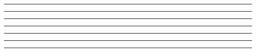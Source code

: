 \hrule height 0.05pt depth 0.05pt width 375pt
\hrule height 0.05pt depth 0.05pt width 375pt
\hrule height 0.05pt depth 0.05pt width 375pt
\hrule height 0.05pt depth 0.05pt width 375pt
\hrule height 0.05pt depth 0.05pt width 375pt
\hrule height 0.05pt depth 0.05pt width 375pt
\hrule height 0.4pt depth 0.4pt width 375pt
\vfil\eject
{} \vbox{
\hglue-5dd
\vrule height 473.3pt depth 8pt width 0.8pt 
\vglue-482.3pt
\vrule height 473.3pt depth 8pt width 0.1pt 
\vglue-482.3pt
\vrule height 473.3pt depth 8pt width 0.1pt 
\vglue-482.3pt
\vrule height 473.3pt depth 8pt width 0.1pt 
\vglue-482.3pt
\vrule height 473.3pt depth 8pt width 0.1pt 
\vglue-482.3pt
\vrule height 473.3pt depth 8pt width 0.1pt 
\vglue-482.3pt
\vrule height 473.3pt depth 8pt width 0.1pt 
\vglue-482.3pt
\vrule height 473.3pt depth 8pt width 0.1pt 
\vglue-482.3pt
\vrule height 473.3pt depth 8pt width 0.1pt 
\vglue-482.3pt
\vrule height 473.3pt depth 8pt width 0.1pt 
\vglue-482.3pt
\hglue-0.4pt
\vrule height 473.3pt depth 8pt width 0.8pt 
\vglue-482.3pt
\vrule height 473.3pt depth 8pt width 0.1pt 
\vglue-482.3pt
\vrule height 473.3pt depth 8pt width 0.1pt 
\vglue-482.3pt
\vrule height 473.3pt depth 8pt width 0.1pt 
\vglue-482.3pt
\vrule height 473.3pt depth 8pt width 0.1pt 
\vglue-482.3pt
\vrule height 473.3pt depth 8pt width 0.1pt 
\vglue-482.3pt
\vrule height 473.3pt depth 8pt width 0.1pt 
\vglue-482.3pt
\vrule height 473.3pt depth 8pt width 0.1pt 
\vglue-482.3pt
\vrule height 473.3pt depth 8pt width 0.1pt 
\vglue-482.3pt
\vrule height 473.3pt depth 8pt width 0.1pt 
\vglue-482.3pt
\hglue-0.4pt
\vrule height 473.3pt depth 8pt width 0.8pt 
\vglue-482.3pt
\vrule height 473.3pt depth 8pt width 0.1pt 
\vglue-482.3pt
\vrule height 473.3pt depth 8pt width 0.1pt 
\vglue-482.3pt
\vrule height 473.3pt depth 8pt width 0.1pt 
\vglue-482.3pt
\vrule height 473.3pt depth 8pt width 0.1pt 
\vglue-482.3pt
\vrule height 473.3pt depth 8pt width 0.1pt 
\vglue-482.3pt
\vrule height 473.3pt depth 8pt width 0.1pt 
\vglue-482.3pt
\vrule height 473.3pt depth 8pt width 0.1pt 
\vglue-482.3pt
\vrule height 473.3pt depth 8pt width 0.1pt 
\vglue-482.3pt
\vrule height 473.3pt depth 8pt width 0.1pt 
}
